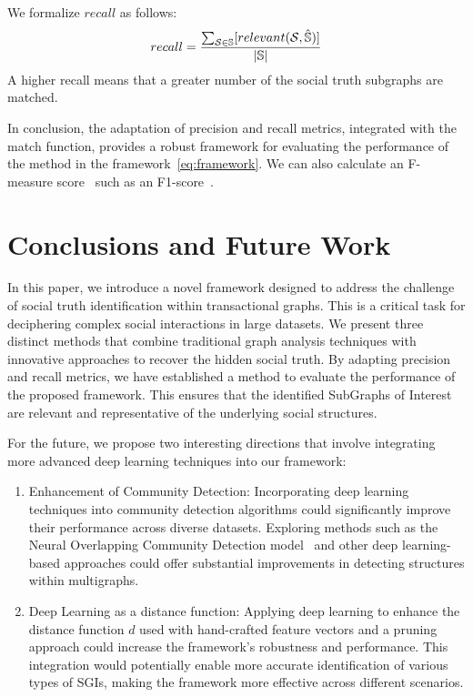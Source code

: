 \documentclass{llncs}
\begin{document}
We formalize \(recall\) as follows:
\begin{equation}
recall = \frac{\sum_{{\cal{S}}\in\mathbb{S}}[relevant({\cal{S}},\hat{\mathbb{S}})] }{|\mathbb{S}|}
\end{equation}
A higher recall means that a greater number of the social truth subgraphs are matched.

In conclusion, the adaptation of precision and recall metrics, integrated with the match function, provides a robust framework for evaluating the performance of the method in the framework~\eqref{eq:framework}.
We can also calculate an F-measure score~\cite{Hand2021} such as an F1-score~\cite{Sokolova2006}.

\section{Conclusions and Future Work}\label{sec:conclusions}
In this paper, we introduce a novel framework designed to address the challenge of social truth identification within transactional graphs.
This is a critical task for deciphering complex social interactions in large datasets.
We present three distinct methods that combine traditional graph analysis techniques with innovative approaches to recover the hidden social truth.
By adapting precision and recall metrics, we have established a method to evaluate the performance of the proposed framework.
This ensures that the identified SubGraphs of Interest are relevant and representative of the underlying social structures.

For the future, we propose two interesting directions that involve integrating more advanced deep learning techniques into our framework:
\begin{enumerate}
\item Enhancement of Community Detection: Incorporating deep learning techniques into community detection algorithms could significantly improve their performance across diverse datasets.
Exploring methods such as the Neural Overlapping Community Detection model~\cite{Shchur2019} and other deep learning-based approaches could offer substantial improvements in detecting structures within multigraphs.
\item Deep Learning as a distance function: Applying deep learning to enhance the distance function \(d\) used with hand-crafted feature vectors and a pruning approach could increase the framework's robustness and performance.
This integration would potentially enable more accurate identification of various types of SGIs, making the framework more effective across different scenarios.
\end{enumerate}
\end{document}
